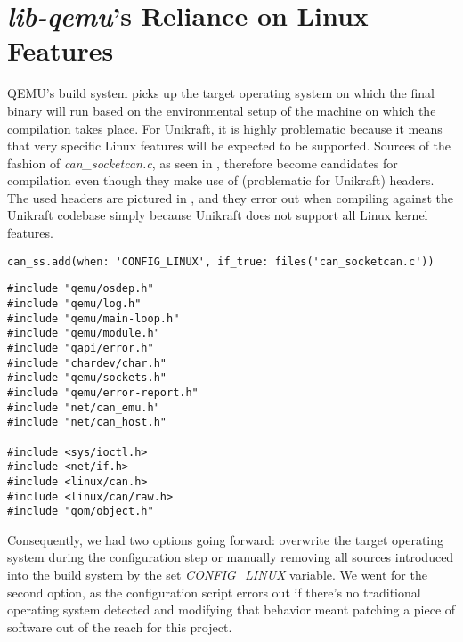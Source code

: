 \section{\textit{lib-qemu}'s Reliance on Linux Features}
\label{sec:lib-qemu-linux-headers}

QEMU's build system picks up the target operating system on which the final binary will run based on the environmental setup of the machine on which the compilation takes place.
For Unikraft, it is highly problematic because it means that very specific Linux features will be expected to be supported.
Sources of the fashion of \textit{can_socketcan.c}, as seen in , therefore become candidates for compilation even though they make use of (problematic for Unikraft) headers.
The used headers are pictured in , and they error out when compiling against the Unikraft codebase simply because Unikraft does not support all Linux kernel features.

\begin{lstlisting}
can_ss.add(when: 'CONFIG_LINUX', if_true: files('can_socketcan.c'))
\end{lstlisting}

\begin{lstlisting}
#include "qemu/osdep.h"
#include "qemu/log.h"
#include "qemu/main-loop.h"
#include "qemu/module.h"
#include "qapi/error.h"
#include "chardev/char.h"
#include "qemu/sockets.h"
#include "qemu/error-report.h"
#include "net/can_emu.h"
#include "net/can_host.h"
    
#include <sys/ioctl.h>
#include <net/if.h>
#include <linux/can.h>
#include <linux/can/raw.h>
#include "qom/object.h"    
\end{lstlisting}

Consequently, we had two options going forward: overwrite the target operating system during the configuration step or manually removing all sources introduced into the build system by the set \textit{CONFIG_LINUX} variable.
We went for the second option, as the configuration script errors out if there's no traditional operating system detected and modifying that behavior meant patching a piece of software out of the reach for this project.
